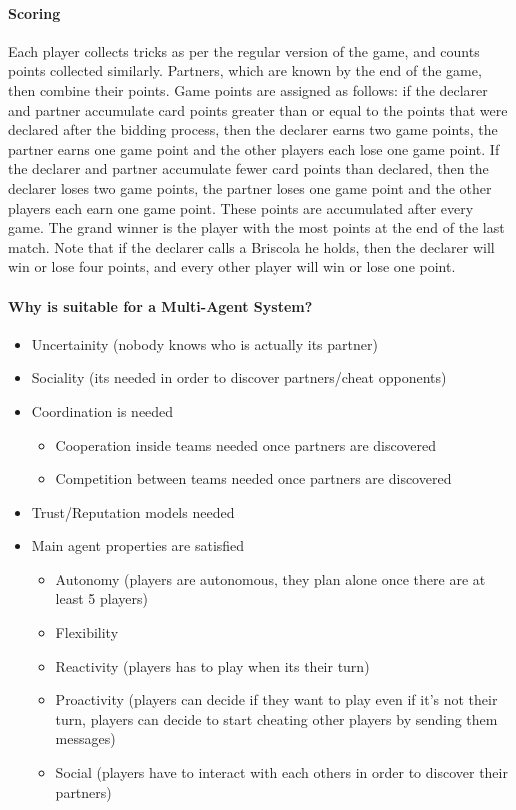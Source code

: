 \documentclass[a4paper]{article}
\begin{document}
\paragraph{Scoring}

Each player collects tricks as per the regular version of the game, and counts points collected similarly. Partners, which are known by the end of the game, then combine their points. Game points are assigned as follows: if the declarer and partner accumulate card points greater than or equal to the points that were declared after the bidding process, then the declarer earns two game points, the partner earns one game point and the other players each lose one game point. If the declarer and partner accumulate fewer card points than declared, then  the declarer loses two game points, the partner loses one game point and the other players each earn one game point. These points are accumulated after every game. The grand winner is the player with the most points at the end of the last match. Note that if the declarer calls a Briscola he holds, then the declarer will win or lose four points, and every other player will win or lose one point.

\paragraph{Why is suitable for a Multi-Agent System?}

\begin{itemize}
  \item Uncertainity (nobody knows who is actually its partner)
  \item Sociality (its needed in order to discover partners/cheat opponents)
  \item Coordination is needed
  \begin{itemize}
    \item Cooperation inside teams needed once partners are discovered
    \item Competition between teams needed once partners are discovered
  \end{itemize}
  \item Trust/Reputation models needed 
  \item Main agent properties are satisfied
  \begin{itemize}
    \item Autonomy (players are autonomous, they plan alone once there are at least 5 players)
    \item Flexibility
    \item Reactivity (players has to play when its their turn)
    \item Proactivity (players can decide if they want to play even if it's not their turn, players can decide to start cheating other players by sending them messages)
    \item Social (players have to interact with each others in order to discover their partners)
  \end{itemize}
\end{itemize}
\end{document}
